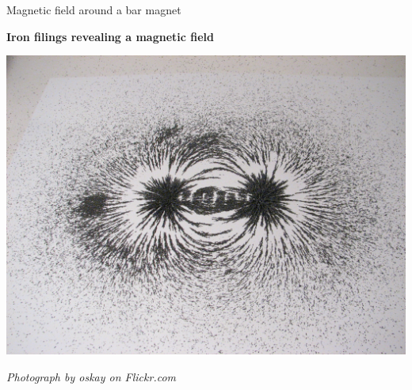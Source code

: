 \begin{Investigation}{Magnetic field around a bar magnet}
\begin{center}
\textbf{Iron filings revealing a magnetic field}\par
 \includegraphics[width=.8\textwidth]{photos/mag_field_oskay.jpg}\par
\textit{Photograph by oskay on Flickr.com}
\end{center}
\end{Investigation}

